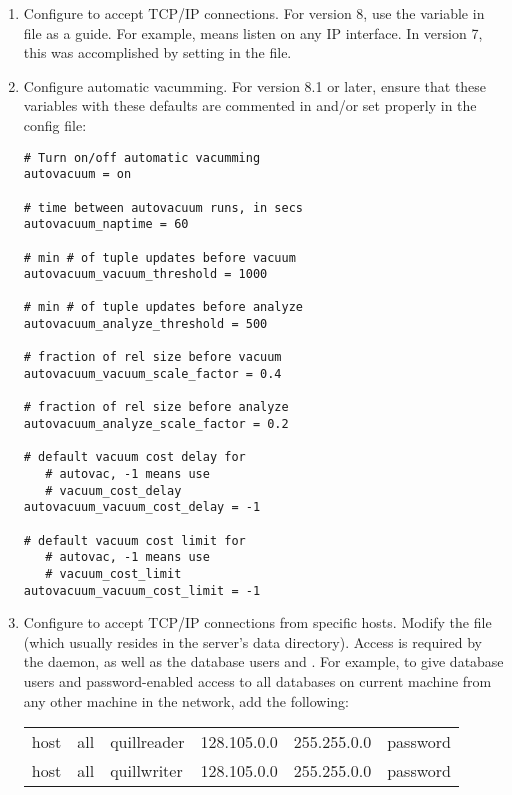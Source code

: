\begin{enumerate}

\item Configure to accept TCP/IP connections.
For  version 8,
use the  variable in 
 file as a guide.
For example,
means listen on any IP interface.
In  version 7,
this was accomplished by setting 
 in the  file.

\item Configure automatic vacumming.
For  version 8.1 or later,
ensure that these variables with these defaults are
commented in and/or set properly in the 
 config file:
\begin{verbatim}
# Turn on/off automatic vacumming
autovacuum = on

# time between autovacuum runs, in secs
autovacuum_naptime = 60

# min # of tuple updates before vacuum
autovacuum_vacuum_threshold = 1000

# min # of tuple updates before analyze
autovacuum_analyze_threshold = 500

# fraction of rel size before vacuum
autovacuum_vacuum_scale_factor = 0.4 

# fraction of rel size before analyze
autovacuum_analyze_scale_factor = 0.2

# default vacuum cost delay for 
   # autovac, -1 means use 
   # vacuum_cost_delay
autovacuum_vacuum_cost_delay = -1  

# default vacuum cost limit for 
   # autovac, -1 means use
   # vacuum_cost_limit
autovacuum_vacuum_cost_limit = -1   
\end{verbatim}


\item Configure  to accept TCP/IP connections from 
specific hosts.
Modify the  file 
(which usually resides in the  server's data directory).
Access is required by the  daemon,
as well as the database users
 and .
For example, to give
database users  and 
password-enabled access to all databases on current machine from any
other machine in the network, add the following:

\begin{tabular}{llllll}
host&all&quillreader&128.105.0.0&255.255.0.0&password\\
host&all&quillwriter&128.105.0.0&255.255.0.0&password
\end{tabular}


\end{enumerate}
